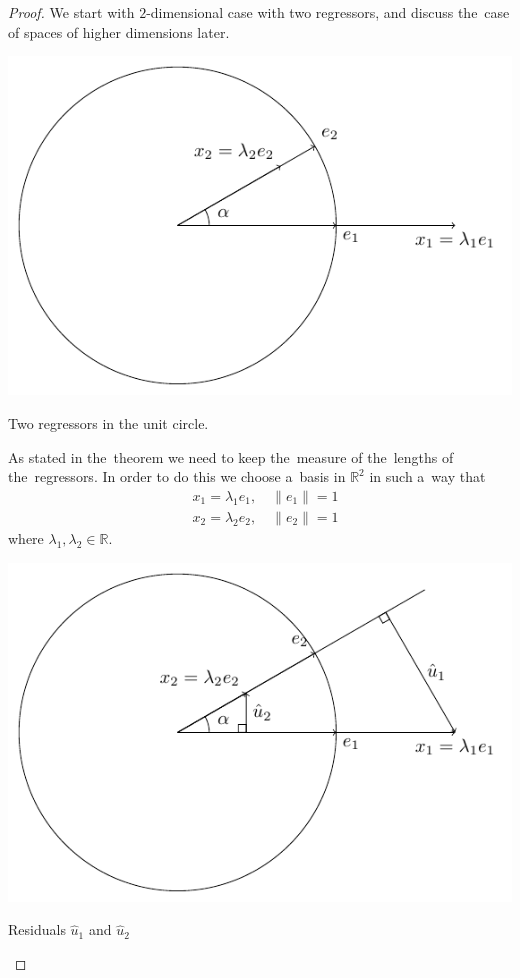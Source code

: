 \begin{proof}

We start with $2$-dimensional case with two regressors,
and discuss the~case of spaces of higher dimensions later.

\begin{marginfigure}
\includegraphics[scale=0.7]{figures/02_duality_original_regressors.pdf}
\caption{Two regressors in the unit circle.}
\end{marginfigure}

As stated in the~theorem we need to keep the~measure of the~lengths of the~regressors.
In order to do this we choose a~basis in $\mathbb{R}^2$ in such a~way that
\begin{align*}
&x_1 = \lambda_1 e_1, \quad \lVert e_1 \rVert = 1 \\
&x_2 = \lambda_2 e_2, \quad \lVert e_2 \rVert = 1
\end{align*}
where $\lambda_1, \lambda_2 \in \mathbb{R}$.

\begin{marginfigure}[2\baselineskip]
\includegraphics[scale=0.7]{figures/02_duality_first_residuals.pdf}
\label{fig:duality_fst_residuals}
\caption{Residuals $\hat{u}_1$ and $\hat{u}_2$}
\end{marginfigure}


\end{proof}
